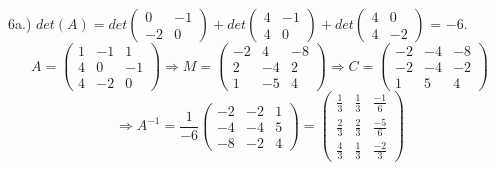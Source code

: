 \documentclass[12pt]{article}
\begin{document}
6a.) $det(A) = det\begin{pmatrix} 0 & -1 \\ -2 & 0 \end{pmatrix} + det\begin{pmatrix} 4 & -1 \\ 4 & 0 \end{pmatrix} + det\begin{pmatrix} 4 & 0 \\ 4 & -2\end{pmatrix}$ = $-6$. 
$$A = \begin{pmatrix} 1 & -1 & 1 \\ 4 & 0 & -1 \\ 4 & -2 & 0 \end{pmatrix} \Rightarrow M = \begin{pmatrix} -2 & 4 & -8 \\ 2 & -4 & 2 \\ 1 & -5 & 4\end{pmatrix} \Rightarrow C = \begin{pmatrix} -2 & -4 & -8 \\ -2 & -4 & -2 \\ 1 & 5 & 4\end{pmatrix}$$
$$\Rightarrow A^{-1} = \frac{1}{-6} \begin{pmatrix} -2 & -2 & 1 \\ -4 & -4 & 5 \\ -8 & -2 & 4\end{pmatrix} = \begin{pmatrix} \frac{1}{3} & \frac{1}{3} & \frac{-1}{6} \\ \frac{2}{3} & \frac{2}{3} & \frac{-5}{6} \\ \frac{4}{3} & \frac{1}{3} & \frac{-2}{3} \end{pmatrix}$$
\end{document}
